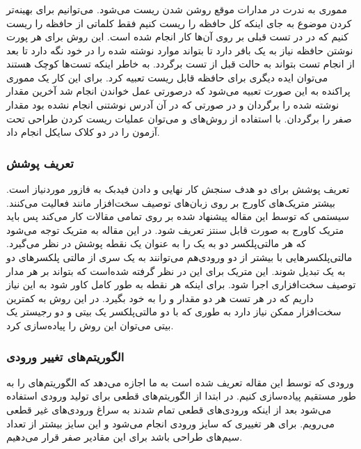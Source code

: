 \documentclass[conference]{IEEEtran}
\begin{document}
\subsubsection{}
مموری به ندرت در مدارات موقع روشن شدن ریست می‌شود.
می‌توانیم برای بهینه‌تر کردن موضوع به جای اینکه کل حافظه را ریست کنیم فقط کلماتی از حافظه را
ریست کنیم که در در تست قبلی بر روی آن‌ها کار انجام شده است.
این روش برای هر پورت نوشتن حافظه نیاز به یک بافر دارد تا بتواند موارد نوشته شده را در خود نگه دارد
تا بعد از انجام تست بتواند به حالت قبل از تست برگردد.
به خاطر اینکه تست‌ها کوچک هستند می‌توان ایده دیگری برای حافظه قابل ریست تعبیه کرد.
برای این کار یک مموری پراکنده به این صورت تعبیه می‌شود که درصورتی عمل خواندن انجام شد
آخرین مقدار نوشته شده را برگردان و در صورتی که در آن آدرس نوشتنی انجام نشده بود مقدار صفر
را برگردان.
با استفاده از روش‌های
و
می‌توان عملیات ریست کردن طراحی تحت آزمون را در دو کلاک سایکل انجام داد.
\subsubsection{تعریف پوشش}
تعریف پوشش برای دو هدف سنجش کار نهایی و دادن فیدبک به فازور موردنیاز است.
بیشتر متریک‌های کاورج بر روی زبان‌های توصیف سخت‌افزار مانند
فعالیت می‌کنند.
سیستمی که توسط این مقاله پیشنهاد شده بر روی تمامی مقالات
کار می‌کند پس باید متریک کاورج به صورت قابل سنتز تعریف شود.
در این مقاله به متریک
توجه می‌شود که هر مالتی‌پلکسر دو به یک را به عنوان یک نقطه پوشش در نظر می‌گیرد.
مالتی‌پلکسر‌هایی با بیشتر از دو ورودی‌هم می‌توانند به یک سری از مالتی پلکسر‌های دو به یک تبدیل شوند.
این متریک برای این در نظر گرفته شده‌است که بتواند بر هر مدار توصیف سخت‌افزاری اجرا شود.
برای اینکه هر نقطه به طور کامل کاور شود به این نیاز داریم که در هر تست
هر دو مقدار
و
را به خود بگیرد.
در
این روش به کمترین سخت‌افزار ممکن نیاز دارد به طوری که با دو مالتی‌پلکسر یک بیتی و دو رجیستر
یک بیتی می‌توان این روش را پیاده‌سازی کرد.
\subsubsection{الگوریتم‌های تغییر ورودی}
ورودی‌ که توسط این مقاله تعریف شده است به ما اجازه می‌دهد که الگوریتم‌های
را به طور مستقیم پیاده‌سازی کنیم.
در ابتدا از الگوریتم‌های قطعی برای تولید ورودی استفاده می‌شود
بعد از اینکه ورودی‌های قطعی تمام شدند به سراغ ورودی‌های غیر قطعی می‌رویم.
برای هر تغییری که سایز ورودی‌ انجام می‌شود و این سایز بیشتر از تعداد سیم‌های طراحی باشد
برای این مقادیر صفر قرار می‌دهیم.
\end{document}
